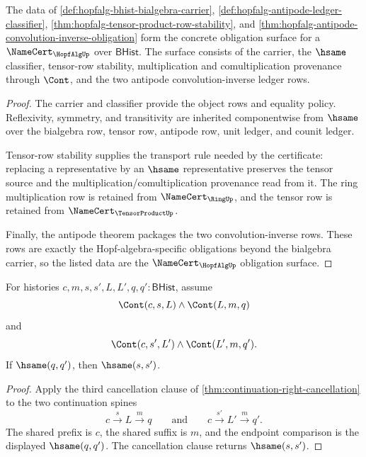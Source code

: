 \begin{theorem}
\label{thm:hopfalg-namecert-obligation-surface}
The data of \autoref{def:hopfalg-bhist-bialgebra-carrier}, \autoref{def:hopfalg-antipode-ledger-classifier}, \autoref{thm:hopfalg-tensor-product-row-stability}, and \autoref{thm:hopfalg-antipode-convolution-inverse-obligation} form the concrete obligation surface for a $\NameCert_{\HopfAlgUp}$ over $\mathsf{BHist}$. The surface consists of the carrier, the $\hsame$ classifier, tensor-row stability, multiplication and comultiplication provenance through $\Cont$, and the two antipode convolution-inverse ledger rows.
\end{theorem}
\begin{proof}
The carrier and classifier provide the object rows and equality policy. Reflexivity, symmetry, and transitivity are inherited componentwise from $\hsame$ over the bialgebra row, tensor row, antipode row, unit ledger, and counit ledger.

Tensor-row stability supplies the transport rule needed by the certificate: replacing a representative by an $\hsame$ representative preserves the tensor source and the multiplication/comultiplication provenance read from it. The ring multiplication row is retained from $\NameCert_{\RingUp}$, and the tensor row is retained from $\NameCert_{\TensorProductUp}$.

Finally, the antipode theorem packages the two convolution-inverse rows. These rows are exactly the Hopf-algebra-specific obligations beyond the bialgebra carrier, so the listed data are the $\NameCert_{\HopfAlgUp}$ obligation surface.
\end{proof}

\begin{lemma}
\label{lem:two-step-continuation-middle-cancellation}
For histories $c,m,s,s',L,L',q,q':\mathsf{BHist}$, assume
$$
\Cont(c,s,L)\land\Cont(L,m,q)
$$
and
$$
\Cont(c,s',L')\land\Cont(L',m,q').
$$
If $\hsame(q,q')$, then $\hsame(s,s')$.
\end{lemma}
\begin{proof}
Apply the third cancellation clause of \autoref{thm:continuation-right-cancellation} to the two continuation spines
$$
c \xrightarrow{s} L \xrightarrow{m} q
\qquad\text{and}\qquad
c \xrightarrow{s'} L' \xrightarrow{m} q'.
$$
The shared prefix is $c$, the shared suffix is $m$, and the endpoint comparison is the displayed $\hsame(q,q')$. The cancellation clause returns $\hsame(s,s')$.
\end{proof}

